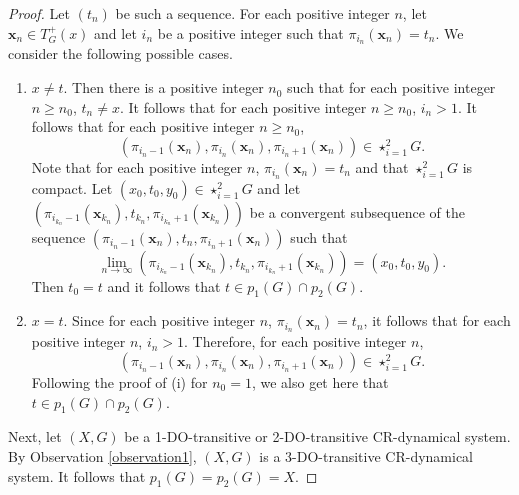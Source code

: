 \documentclass[a4paper,12pt]{article} %
\newcommand{\orbitt}{\mathcal{U}^{\oplus}}
\newcommand{\tplus}{T^{+}}
\begin{document}
\begin{proof}
Let $(t_n)$ be such a sequence.  For each positive integer $n$, let $\mathbf x_n\in \tplus_G(x)$ and let $i_n$ be a positive integer such that $\pi_{i_n}(\mathbf x_n)=t_{n}$. We consider the following possible cases.
\begin{enumerate}
\item[(i)] $x\neq t$. Then there is a positive integer $n_0$ such that for each positive integer $n\geq n_0$, $t_{n}\neq x$. It follows that for each positive integer $n\geq n_0$, $i_n>1$. It follows that for each positive integer $n\geq n_0$, 
$$
(\pi_{i_n-1}(\mathbf x_n),\pi_{i_n}(\mathbf x_n),\pi_{i_n+1}(\mathbf x_n))\in \star_{i=1}^{2}G.
$$
 Note that for each positive integer $n$, $\pi_{i_n}(\mathbf x_n)=t_{n}$ and that $\star_{i=1}^{2}G$ is compact.  Let $(x_0,t_0,y_0)\in \star_{i=1}^{2}G$ and let $(\pi_{i_{k_n}-1}(\mathbf x_{k_n}),t_{{k_n}},\pi_{i_{k_n}+1}(\mathbf x_{k_n}))$ be a convergent subsequence of the sequence $(\pi_{i_n-1}(\mathbf x_n),t_{n},\pi_{i_n+1}(\mathbf x_n))$ such that
$$
\lim_{n\to \infty}(\pi_{i_{k_n}-1}(\mathbf x_{k_n}),t_{{k_n}},\pi_{i_{k_n}+1}(\mathbf x_{k_n}))=(x_0,t_0,y_0).
$$
Then $t_0=t$ and it follows that $t\in p_1(G)\cap p_2(G)$. 
\item[(ii)] $x=t$. %
Since for each positive integer $n$, $\pi_{i_n}(\mathbf x_n)=t_{n}$, it follows that for each positive integer $n$, $i_n>1$. Therefore, for each positive integer $n$, 
$$
(\pi_{i_n-1}(\mathbf x_n),\pi_{i_n}(\mathbf x_n),\pi_{i_n+1}(\mathbf x_n))\in \star_{i=1}^{2}G.
$$
Following the proof of (i) for $n_0=1$, we also get here that $t\in p_1(G)\cap p_2(G)$. 
\end{enumerate}


Next, let $(X,G)$ be a 1-DO-transitive or 2-DO-transitive CR-dynamical system. By Observation \ref{observation1},  $(X,G)$ is a 3-DO-transitive CR-dynamical system. It follows that $p_1(G)=p_2(G)=X$.
\end{proof}
\end{document}
